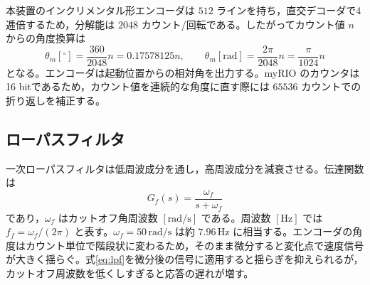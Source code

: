 \documentclass[dvipdfmx,a4paper,11pt]{jsarticle}
\begin{document}
本装置のインクリメンタル形エンコーダは $512$ ラインを持ち，直交デコーダで4逓倍するため，分解能は $2048$ カウント/回転である\cite{manual}。したがってカウント値 $n$ からの角度換算は
\begin{equation}
 \theta_m[^{\circ}]=\frac{360}{2048}n=0.17578125n,\qquad
 \theta_m[\mathrm{rad}]=\frac{2\pi}{2048}n=\frac{\pi}{1024}n
 \label{eq:encoder}
\end{equation}
となる。エンコーダは起動位置からの相対角を出力する。myRIO のカウンタは16 bitであるため，カウント値を連続的な角度に直す際には $65536$ カウントでの折り返しを補正する。

\subsection{ローパスフィルタ}
一次ローパスフィルタは低周波成分を通し，高周波成分を減衰させる。伝達関数は
\begin{equation}
 G_f(s)=\frac{\omega_f}{s+\omega_f}
 \label{eq:lpf}
\end{equation}
であり，$\omega_f$ はカットオフ角周波数 $[\mathrm{rad/s}]$ である。周波数 $[\mathrm{Hz}]$ では $f_f=\omega_f/(2\pi)$ と表す。$\omega_f=50\,\mathrm{rad/s}$ は約 $7.96\,\mathrm{Hz}$ に相当する。エンコーダの角度はカウント単位で階段状に変わるため，そのまま微分すると変化点で速度信号が大きく揺らぐ。式\eqref{eq:lpf}を微分後の信号に適用すると揺らぎを抑えられるが，カットオフ周波数を低くしすぎると応答の遅れが増す。
\end{document}
